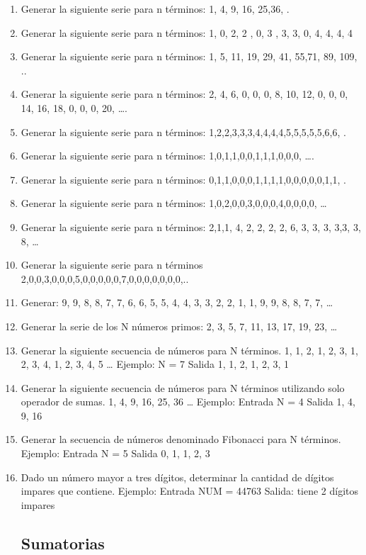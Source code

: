 \documentclass{scrartcl}
\begin{document}
\begin{enumerate}
		\item Generar la siguiente serie para n términos: 1, 4, 9, 16, 25,36, .
		\item Generar la siguiente serie para n términos: 1, 0, 2, 2 , 0, 3 , 3, 3, 0, 4, 4, 4, 4
		\item Generar la siguiente serie para n términos: 1, 5, 11, 19, 29, 41, 55,71, 89, 109, ..
		\item Generar la siguiente serie para n términos:
		2, 4, 6, 0, 0, 0, 8, 10, 12, 0, 0, 0, 14, 16, 18, 0, 0, 0, 20, ….
		\item Generar la siguiente serie para n términos: 1,2,2,3,3,3,4,4,4,4,5,5,5,5,5,6,6, .
		\item Generar la siguiente serie para n términos: 1,0,1,1,0,0,1,1,1,0,0,0, ….
		\item Generar la siguiente serie para n términos: 0,1,1,0,0,0,1,1,1,1,0,0,0,0,0,1,1, .
		\item Generar la siguiente serie para n términos: 1,0,2,0,0,3,0,0,0,4,0,0,0,0, …
		\item Generar la siguiente serie para n términos:
		2,1,1, 4, 2, 2, 2, 2, 6, 3, 3, 3, 3,3, 3, 8, …
		\item Generar la siguiente serie para n términos 2,0,0,3,0,0,0,5,0,0,0,0,0,7,0,0,0,0,0,0,0,..
		\item Generar: 9, 9, 8, 8, 7, 7, 6, 6, 5, 5, 4, 4, 3, 3, 2, 2, 1, 1, 9, 9, 8, 8, 7, 7, …
		\item Generar la serie de los N números primos: 2, 3, 5, 7, 11, 13, 17, 19, 23, …
		\item Generar la siguiente secuencia de números para N términos.
		1, 1, 2, 1, 2, 3, 1, 2, 3, 4, 1, 2, 3, 4, 5 …
		Ejemplo: N = 7
		Salida 1, 1, 2, 1, 2, 3, 1
		\item Generar la siguiente secuencia de números para N términos utilizando solo operador de sumas.
		1, 4, 9, 16, 25, 36 …
		Ejemplo: Entrada
		N = 4
		Salida 1, 4, 9, 16
		\item Generar la secuencia de números denominado Fibonacci para N términos.
		Ejemplo: Entrada
		N = 5
		Salida 0, 1, 1, 2, 3
		\item Dado un número mayor a tres dígitos, determinar la cantidad de dígitos impares que contiene.
		Ejemplo: Entrada
		NUM = 44763
		Salida:
		tiene 2 dígitos impares
		
		\subsection{Sumatorias}
		

\end{enumerate}
\end{document}
